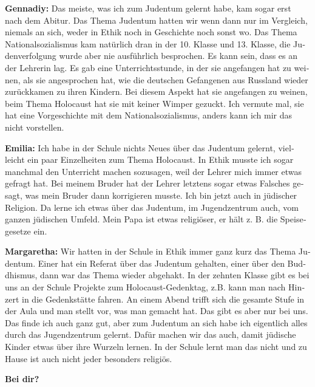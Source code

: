 \begin{otherlanguage}{ngerman}
\textbf{Gennadiy:} Das meiste, was ich zum Judentum gelernt habe, kam sogar erst nach dem Abitur. Das Thema Judentum hatten wir wenn dann nur im Vergleich, niemals an sich, weder in Ethik noch in Geschichte noch sonst wo. Das Thema Nationalsozialismus kam natürlich dran in der 10. Klasse und 13. Klasse, die Judenverfolgung wurde aber nie ausführlich besprochen. Es kann sein, dass es an der Lehrerin lag. Es gab eine Unterrichtsstunde, in der sie angefangen hat zu weinen, als sie angesprochen hat, wie die deutschen Gefangenen aus Russland wieder zurückkamen zu ihren Kindern. Bei diesem Aspekt hat sie angefangen zu weinen, beim Thema Holocaust hat sie mit keiner Wimper gezuckt. Ich vermute mal, sie hat eine Vorgeschichte mit dem Nationalsozialismus, anders kann ich mir das nicht vorstellen. 

\textbf{Emilia:} Ich habe in der Schule nichts Neues über das Judentum gelernt, vielleicht ein paar Einzelheiten zum Thema Holocaust. In Ethik musste ich sogar manchmal den Unterricht machen sozusagen, weil der Lehrer mich immer etwas gefragt hat. Bei meinem Bruder hat der Lehrer letztens sogar etwas Falsches gesagt, was mein Bruder dann korrigieren musste. Ich bin jetzt auch in jüdischer Religion. Da lerne ich etwas über das Judentum, im Jugendzentrum auch, vom ganzen jüdischen Umfeld. Mein Papa ist etwas religiöser, er hält z. B. die Speisegesetze ein. 

\textbf{Margaretha:} Wir hatten in der Schule in Ethik immer ganz kurz das Thema Judentum. Einer hat ein Referat über das Judentum gehalten, einer über den Buddhismus, dann war das Thema wieder abgehakt. In der zehnten Klasse gibt es bei uns an der Schule Projekte zum Holocaust-Gedenktag, z.B. kann man nach Hinzert in die Gedenkstätte fahren. An einem Abend trifft sich die gesamte Stufe in der Aula und man stellt vor, was man gemacht hat. Das gibt es aber nur bei uns. Das finde ich auch ganz gut, aber zum Judentum an sich habe ich eigentlich alles durch das Jugendzentrum gelernt. Dafür machen wir das auch, damit jüdische Kinder etwas über ihre Wurzeln lernen. In der Schule lernt man das nicht und zu Hause ist auch nicht jeder besonders religiös. 

\textbf{Bei dir?} 


\end{otherlanguage}
